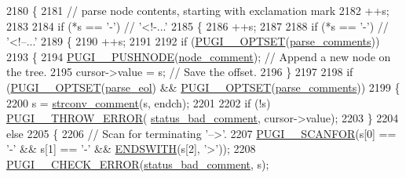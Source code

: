 \begin{DoxyCode}
2180         \{
2181             \textcolor{comment}{// parse node contents, starting with exclamation mark}
2182             ++s;
2183 
2184             \textcolor{keywordflow}{if} (*s == \textcolor{charliteral}{'-'}) \textcolor{comment}{// '<!-...'}
2185             \{
2186                 ++s;
2187 
2188                 \textcolor{keywordflow}{if} (*s == \textcolor{charliteral}{'-'}) \textcolor{comment}{// '<!--...'}
2189                 \{
2190                     ++s;
2191 
2192                     \textcolor{keywordflow}{if} (\hyperlink{pugixml_8cpp_a06966692c7864407ceffff065b4d7da2}{PUGI\_\_OPTSET}(\hyperlink{namespacepugi_adcab316176bfaf69158339962fb4ad38}{parse\_comments}))
2193                     \{
2194                         \hyperlink{pugixml_8cpp_accdd212cd2831662c3c2dda668246f8a}{PUGI\_\_PUSHNODE}(\hyperlink{namespacepugi_a137e94a038e4ab0ada6477cf7f6153a9a445fef674a66777dfd28dbd6bab14fed}{node\_comment}); \textcolor{comment}{// Append a new node on the
       tree.}
2195                         cursor->value = s; \textcolor{comment}{// Save the offset.}
2196                     \}
2197 
2198                     \textcolor{keywordflow}{if} (\hyperlink{pugixml_8cpp_a06966692c7864407ceffff065b4d7da2}{PUGI\_\_OPTSET}(\hyperlink{namespacepugi_ad4e017365d2ff3ee04e226c35129b475}{parse\_eol}) && 
      \hyperlink{pugixml_8cpp_a06966692c7864407ceffff065b4d7da2}{PUGI\_\_OPTSET}(\hyperlink{namespacepugi_adcab316176bfaf69158339962fb4ad38}{parse\_comments}))
2199                     \{
2200                         s = \hyperlink{pugixml_8cpp_acd89f6b92cd5a83b4e8a56bff9e55118}{strconv\_comment}(s, endch);
2201 
2202                         \textcolor{keywordflow}{if} (!s) \hyperlink{pugixml_8cpp_a8af02d87a10272f03f96ab93a96d7202}{PUGI\_\_THROW\_ERROR}(
      \hyperlink{namespacepugi_a9054ca609e12afb8f3e5892fc6c0b555a563327f534e9b3ce55f9f7364aa746b2}{status\_bad\_comment}, cursor->value);
2203                     \}
2204                     \textcolor{keywordflow}{else}
2205                     \{
2206                         \textcolor{comment}{// Scan for terminating '-->'.}
2207                         \hyperlink{pugixml_8cpp_a98386e86f2c7e7e477939d209a5bbf7e}{PUGI\_\_SCANFOR}(s[0] == \textcolor{charliteral}{'-'} && s[1] == \textcolor{charliteral}{'-'} && 
      \hyperlink{pugixml_8cpp_a3a72d0b2c0e7f99940ce8fbcc69e532f}{ENDSWITH}(s[2], \textcolor{charliteral}{'>'}));
2208                         \hyperlink{pugixml_8cpp_a03531d9b3c74f0843567257537edfd53}{PUGI\_\_CHECK\_ERROR}(\hyperlink{namespacepugi_a9054ca609e12afb8f3e5892fc6c0b555a563327f534e9b3ce55f9f7364aa746b2}{status\_bad\_comment}, s);

\end{DoxyCode}
